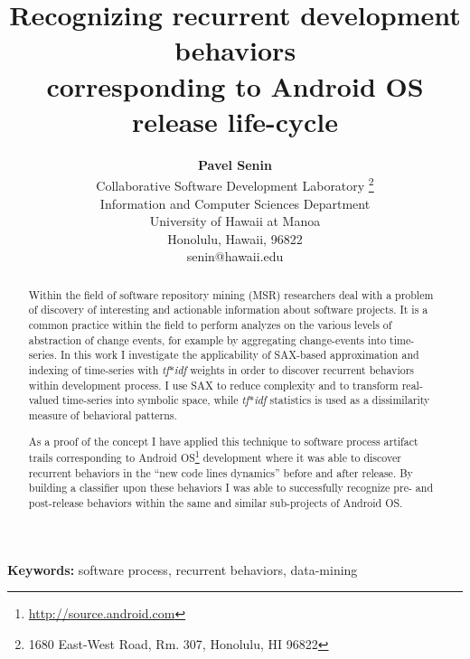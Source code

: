 \documentclass[conference]{worldcomp}
\title{\bf Recognizing recurrent development behaviors\\ corresponding to Android OS release life-cycle}           %
\author{
{\bfseries Pavel Senin}\\
Collaborative Software Development Laboratory \thanks{1680 East-West Road, Rm. 307, Honolulu, HI 96822}\\
Information and Computer Sciences Department\\
University of Hawaii at Manoa\\
Honolulu, Hawaii, 96822\\
senin@hawaii.edu}
\begin{document}
\maketitle                        %

\begin{abstract}
Within the field of software repository mining (MSR) researchers deal with a problem 
of discovery of interesting and actionable information about software projects.
It is a common practice within the field to perform analyzes on the various 
levels of abstraction of change events, for example by aggregating change-events 
into time-series.
In this work I investigate the applicability of SAX-based approximation and 
indexing of time-series with \textit{tf$\ast$idf} weights in order to discover recurrent 
behaviors within development process. 
I use SAX to reduce complexity and to transform real-valued time-series 
into symbolic space, while \textit{tf$\ast$idf} statistics is used as a dissimilarity measure 
of behavioral patterns.

As a proof of the concept I have applied this technique to software process artifact trails 
corresponding to Android OS\footnote[1]{\url{http://source.android.com}} development where
it was able to discover recurrent behaviors in the ``new code lines dynamics'' before 
and after release. By building a classifier upon these behaviors I was able to successfully 
recognize pre- and post-release behaviors within the same and similar sub-projects of Android OS.
\end{abstract}

\vspace{1em}
\noindent\textbf{Keywords:}
 {\small  software process, recurrent behaviors, data-mining} %

%
\end{document}
